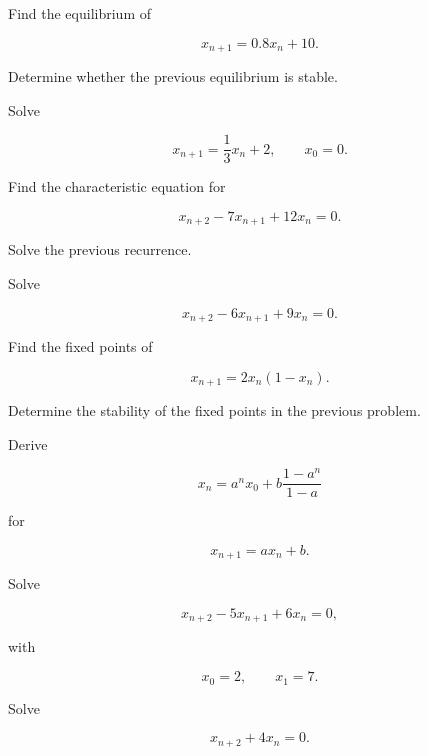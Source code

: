 \begin{exercise}[2]
Find the equilibrium of

\[
x_{n+1}
=
0.8x_n+10.
\]
\end{exercise}

\begin{exercise}[2]
Determine whether the previous equilibrium is stable.
\end{exercise}

\begin{exercise}[2]
Solve

\[
x_{n+1}
=
\frac13x_n+2,
\qquad
x_0=0.
\]
\end{exercise}

\begin{exercise}[2]
Find the characteristic equation for

\[
x_{n+2}
-
7x_{n+1}
+
12x_n
=
0.
\]
\end{exercise}

\begin{exercise}[2]
Solve the previous recurrence.
\end{exercise}

\begin{exercise}[2]
Solve

\[
x_{n+2}
-
6x_{n+1}
+
9x_n
=
0.
\]
\end{exercise}

\begin{exercise}[2]
Find the fixed points of

\[
x_{n+1}
=
2x_n(1-x_n).
\]
\end{exercise}

\begin{exercise}[2]
Determine the stability of the fixed points in the previous problem.
\end{exercise}

\begin{exercise}[3]
Derive

\[
x_n
=
a^nx_0
+
b
\frac{
1-a^n
}{
1-a
}
\]

for

\[
x_{n+1}=ax_n+b.
\]
\end{exercise}

\begin{exercise}[3]
Solve

\[
x_{n+2}
-
5x_{n+1}
+
6x_n
=
0,
\]

with

\[
x_0=2,
\qquad
x_1=7.
\]
\end{exercise}

\begin{exercise}[3]
Solve

\[
x_{n+2}
+
4x_n
=
0.
\]
\end{exercise}

